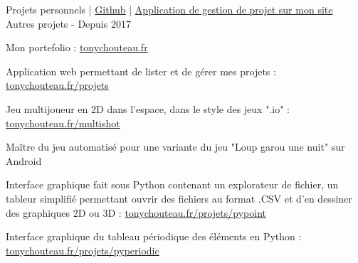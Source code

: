 \begin{cventries}
  \cventry
    {Projets personnels | \href{https://github.com/TonyChouteau?tab=repositories}{\faGithubSquare\acvHeaderIconSep Github} | 
    \href{https://www.tonychouteau.fr/projets/}
    {\faHome\acvHeaderIconSep Application de gestion de projet sur mon site} %
    } %
    {Autres projets} %
    {-} %
    {Depuis 2017} %
    {
      \begin{cvitems} %
        \item {Mon portefolio : \href{https://www.tonychouteau.fr}{tonychouteau.fr}}
        \item {Application web permettant de lister et de gérer mes projets : \href{https://www.tonychouteau.fr/projets}{tonychouteau.fr/projets}}
        \item {Jeu multijoueur en 2D dans l'espace, dans le style des jeux ".io" : \href{https://www.tonychouteau.fr/multishot}{tonychouteau.fr/multishot}}
        \item {Maître du jeu automatisé pour une variante du jeu "Loup garou une nuit" sur Android}
        \item {Interface graphique fait sous Python contenant un explorateur de fichier, un tableur simplifié permettant ouvrir des fichiers au format .CSV et d’en dessiner des graphiques 2D ou 3D : \href{https://www.tonychouteau.fr/projets/pypoint}{tonychouteau.fr/projets/pypoint}}
        \item {Interface graphique du tableau périodique des éléments en Python : \href{https://www.tonychouteau.fr/projets/pyperiodic}{tonychouteau.fr/projets/pyperiodic}}
      \end{cvitems}
    }
\end{cventries}
